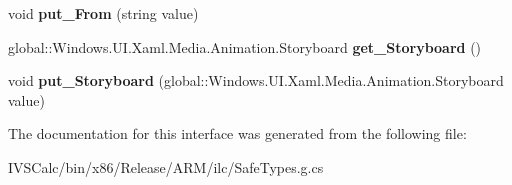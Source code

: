 \begin{DoxyCompactItemize}
void {\bfseries put\+\_\+\+From} (string value)
\item 
\mbox{\label{interface_windows_1_1_u_i_1_1_xaml_1_1_i_visual_transition_a6f0dce011fe22879ce853fb3d8cef56c}} 
global\+::\+Windows.\+U\+I.\+Xaml.\+Media.\+Animation.\+Storyboard {\bfseries get\+\_\+\+Storyboard} ()
\item 
\mbox{\label{interface_windows_1_1_u_i_1_1_xaml_1_1_i_visual_transition_a67e5ea20b8c0ab43ea43fbcb294ee975}} 
void {\bfseries put\+\_\+\+Storyboard} (global\+::\+Windows.\+U\+I.\+Xaml.\+Media.\+Animation.\+Storyboard value)
\end{DoxyCompactItemize}


The documentation for this interface was generated from the following file\+:\begin{DoxyCompactItemize}
\item 
I\+V\+S\+Calc/bin/x86/\+Release/\+A\+R\+M/ilc/Safe\+Types.\+g.\+cs\end{DoxyCompactItemize}
